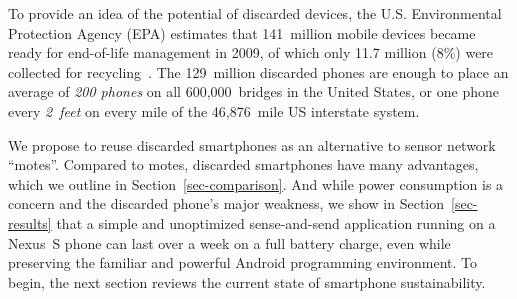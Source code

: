 To provide an idea of the potential of discarded devices, the U.S.
Environmental Protection Agency (EPA) estimates that 141~million mobile
devices became ready for end-of-life management in 2009, of which only 11.7
million (8\%) were collected for recycling~\cite{epa-ewasteweb}. The
129~million discarded phones are enough to place an average of \textit{200
phones} on all 600,000~bridges in the United States, or one phone every
\textit{2~feet} on every mile of the 46,876~mile US interstate system.

We propose to reuse discarded smartphones as an alternative to sensor network
``motes''. Compared to motes, discarded smartphones have many advantages,
which we outline in Section~\ref{sec-comparison}. And while power consumption
is a concern and the discarded phone's major weakness, we show in
Section~\ref{sec-results} that a simple and unoptimized sense-and-send
application running on a Nexus~S phone can last over a week on a full battery
charge, even while preserving the familiar and powerful Android programming
environment. To begin, the next section reviews the current state of
smartphone sustainability.
